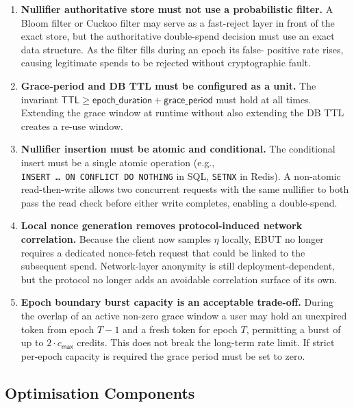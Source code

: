 \documentclass[11pt]{article}
\theoremstyle{definitionstyle}
\theoremstyle{plain}
\begin{document}
\begin{enumerate}[leftmargin=*,label=\textbf{M\arabic*.}]
\item \textbf{Nullifier authoritative store must not use a probabilistic filter.}
  A Bloom filter or Cuckoo filter may serve as a fast-reject layer in front
  of the exact store, but the authoritative double-spend decision must use
  an exact data structure.  As the filter fills during an epoch its false-
  positive rate rises, causing legitimate spends to be rejected without
  cryptographic fault.

\item \textbf{Grace-period and DB TTL must be configured as a unit.}
  The invariant $\mathsf{TTL} \ge \mathsf{epoch\_duration} +
  \mathsf{grace\_period}$ must hold at all times.  Extending the grace window
  at runtime without also extending the DB TTL creates a re-use window.

\item \textbf{Nullifier insertion must be atomic and conditional.}
  The conditional insert must be a single atomic operation (e.g.,
  \texttt{INSERT~\ldots~ON~CONFLICT~DO~NOTHING} in SQL, \texttt{SETNX} in
  Redis).  A non-atomic read-then-write allows two concurrent requests with
  the same nullifier to both pass the read check before either write
  completes, enabling a double-spend.

\item \textbf{Local nonce generation removes protocol-induced network correlation.}
  Because the client now samples $\eta$ locally, EBUT no longer requires a
  dedicated nonce-fetch request that could be linked to the subsequent spend.
  Network-layer anonymity is still deployment-dependent, but the protocol no
  longer adds an avoidable correlation surface of its own.

\item \textbf{Epoch boundary burst capacity is an acceptable trade-off.}
  During the overlap of an active non-zero grace window a user may hold an unexpired
  token from epoch $T-1$ and a fresh token for epoch $T$, permitting a
  burst of up to $2 \cdot c_{\mathsf{max}}$ credits.  This does not break
  the long-term rate limit.  If strict per-epoch capacity is required the
  grace period must be set to zero.

\end{enumerate}

\subsection{Optimisation Components}
\label{sec:optimisations}
\end{document}
